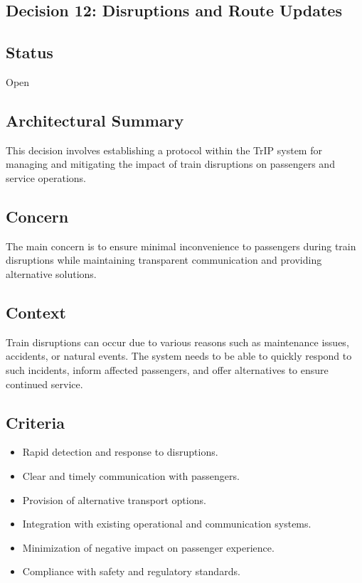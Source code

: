 \subsection{Decision 12: Disruptions and Route Updates}

\subsection*{Status}
Open

\subsection*{Architectural Summary}
This decision involves establishing a protocol within the TrIP system for managing and mitigating the impact of train disruptions on passengers and service operations.

\subsection*{Concern}
The main concern is to ensure minimal inconvenience to passengers during train disruptions while maintaining transparent communication and providing alternative solutions.

\subsection*{Context}
Train disruptions can occur due to various reasons such as maintenance issues, accidents, or natural events. The system needs to be able to quickly respond to such incidents, inform affected passengers, and offer alternatives to ensure continued service.

\subsection*{Criteria}
\begin{itemize}
    \item Rapid detection and response to disruptions.
    \item Clear and timely communication with passengers.
    \item Provision of alternative transport options.
    \item Integration with existing operational and communication systems.
    \item Minimization of negative impact on passenger experience.
    \item Compliance with safety and regulatory standards.
\end{itemize}

